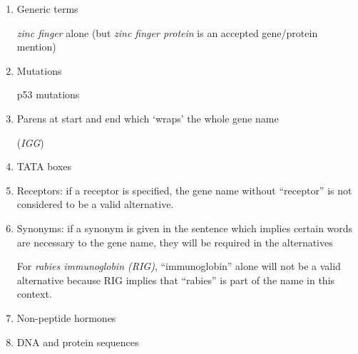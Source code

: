 \begin{enumerate}

\item Generic terms

\emph{zinc finger} alone (but \emph{zinc finger protein} is an accepted gene/protein mention)

\item Mutations

p53 mutations

\item Parens at start and end which `wraps' the whole gene name

(\emph{IGG})

\item TATA boxes

\item Receptors: if a receptor is specified, the gene name without ``receptor'' is not
considered to be a valid alternative.

\item Synonyms: if a synonym is given in the sentence which implies certain words are
necessary to the gene name, they will be required in the alternatives

For \emph{rabies immunoglobin (RIG)}, ``immunoglobin'' alone will not
be a valid alternative because RIG implies that ``rabies'' is part of the name in this
context.

\item Non-peptide hormones

\item DNA and protein sequences

\end{enumerate}
